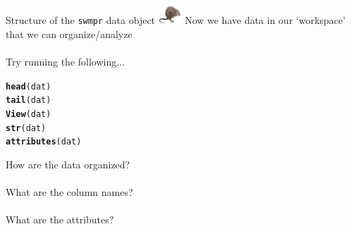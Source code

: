 \documentclass[xcolor=dvipsnames,serif]{beamer}\usepackage[]{graphicx}\usepackage[]{color}
\makeatletter
\newcommand{\hlstd}[1]{\textcolor[rgb]{0.345,0.345,0.345}{#1}}%
\newcommand{\hlkwd}[1]{\textcolor[rgb]{0.737,0.353,0.396}{\textbf{#1}}}%
\newenvironment{kframe}{%
 \def\at@end@of@kframe{}%
 \ifinner\ifhmode%
  \def\at@end@of@kframe{\end{minipage}}%
  \begin{minipage}{\columnwidth}%
 \fi\fi%
 \def\FrameCommand##1{\hskip\@totalleftmargin \hskip-\fboxsep
 \colorbox{shadecolor}{##1}\hskip-\fboxsep
     \hskip-\linewidth \hskip-\@totalleftmargin \hskip\columnwidth}%
 \MakeFramed {\advance\hsize-\width
   \@totalleftmargin\z@ \linewidth\hsize
   \@setminipage}}%
 {\par\unskip\endMakeFramed%
 \at@end@of@kframe}
\newenvironment{knitrout}{}{} %
\makeatother
\begin{document}
\begin{frame}[fragile]{Structure of the \texttt{swmpr} data object \includegraphics[width = 0.065\textwidth]{imgs/swmprat.png}}
\onslide<+->
Now we have data in our `workspace' that we can organize/analyze \\~\\
Try running the following...
\begin{knitrout}\scriptsize
{}\color{fgcolor}\begin{kframe}
\begin{alltt}
\hlkwd{head}\hlstd{(dat)}
\hlkwd{tail}\hlstd{(dat)}
\hlkwd{View}\hlstd{(dat)}
\hlkwd{str}\hlstd{(dat)}
\hlkwd{attributes}\hlstd{(dat)}
\end{alltt}
\end{kframe}
\end{knitrout}
\onslide<+->
How are the data organized?  \\~\\
What are the column names? \\~\\
What are the attributes?
\end{frame}
\end{document}
